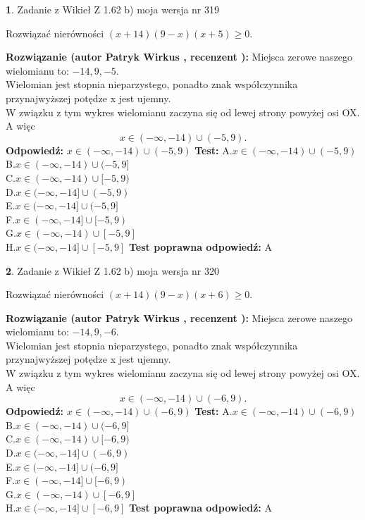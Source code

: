 \documentclass[12pt, a4paper]{article}
\theoremstyle{definition} %
\newtheorem{zad}{}
\newcommand{\zadStart}[1]{\begin{zad}#1\newline}
\newcommand{\zadStop}{\end{zad}}
\newcommand{\rozwStart}[2]{\noindent \textbf{Rozwiązanie (autor #1 , recenzent #2): }\newline}
\newcommand{\rozwStop}{\newline}
\newcommand{\odpStart}{\noindent \textbf{Odpowiedź:}\newline}
\newcommand{\odpStop}{\newline}
\newcommand{\testStart}{\noindent \textbf{Test:}\newline}
\newcommand{\testStop}{\newline}
\newcommand{\kluczStart}{\noindent \textbf{Test poprawna odpowiedź:}\newline}
\newcommand{\kluczStop}{\newline}
\begin{document}
\zadStart{Zadanie z Wikieł Z 1.62 b) moja wersja nr 319}

Rozwiązać nierówności $(x+14)(9-x)(x+5)\ge0$.
\zadStop
\rozwStart{Patryk Wirkus}{}
Miejsca zerowe naszego wielomianu to: $-14, 9, -5$.\\
Wielomian jest stopnia nieparzystego, ponadto znak współczynnika przy\linebreak najwyższej potędze x jest ujemny.\\ W związku z tym wykres wielomianu zaczyna się od lewej strony powyżej osi OX. A więc $$x \in (-\infty,-14) \cup (-5,9).$$
\rozwStop
\odpStart
$x \in (-\infty,-14) \cup (-5,9)$
\odpStop
\testStart
A.$x \in (-\infty,-14) \cup (-5,9)$\\
B.$x \in (-\infty,-14) \cup (-5,9]$\\
C.$x \in (-\infty,-14) \cup [-5,9)$\\
D.$x \in (-\infty,-14] \cup (-5,9)$\\
E.$x \in (-\infty,-14] \cup (-5,9]$\\
F.$x \in (-\infty,-14] \cup [-5,9)$\\
G.$x \in (-\infty,-14) \cup [-5,9]$\\
H.$x \in (-\infty,-14] \cup [-5,9]$
\testStop
\kluczStart
A
\kluczStop



\zadStart{Zadanie z Wikieł Z 1.62 b) moja wersja nr 320}

Rozwiązać nierówności $(x+14)(9-x)(x+6)\ge0$.
\zadStop
\rozwStart{Patryk Wirkus}{}
Miejsca zerowe naszego wielomianu to: $-14, 9, -6$.\\
Wielomian jest stopnia nieparzystego, ponadto znak współczynnika przy\linebreak najwyższej potędze x jest ujemny.\\ W związku z tym wykres wielomianu zaczyna się od lewej strony powyżej osi OX. A więc $$x \in (-\infty,-14) \cup (-6,9).$$
\rozwStop
\odpStart
$x \in (-\infty,-14) \cup (-6,9)$
\odpStop
\testStart
A.$x \in (-\infty,-14) \cup (-6,9)$\\
B.$x \in (-\infty,-14) \cup (-6,9]$\\
C.$x \in (-\infty,-14) \cup [-6,9)$\\
D.$x \in (-\infty,-14] \cup (-6,9)$\\
E.$x \in (-\infty,-14] \cup (-6,9]$\\
F.$x \in (-\infty,-14] \cup [-6,9)$\\
G.$x \in (-\infty,-14) \cup [-6,9]$\\
H.$x \in (-\infty,-14] \cup [-6,9]$
\testStop
\kluczStart
A
\kluczStop
\end{document}
